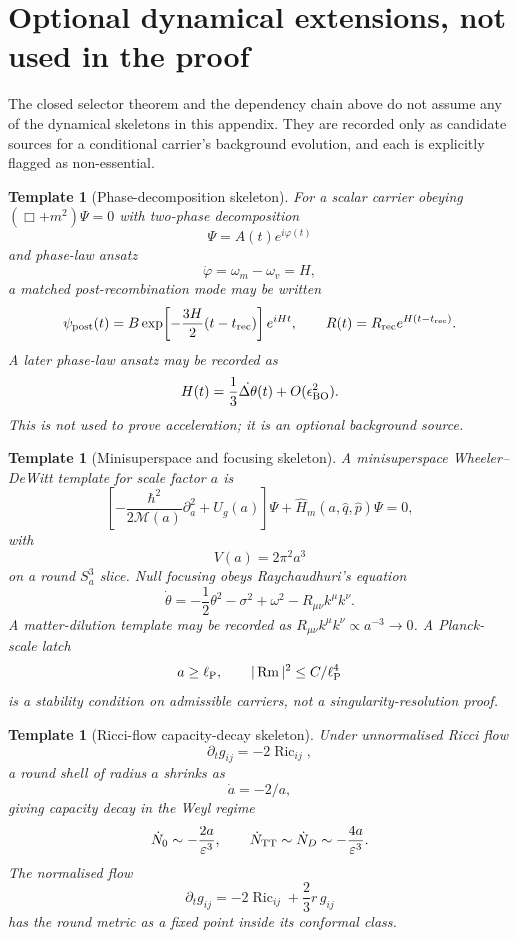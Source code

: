\documentclass[11pt,a4paper]{article}
\newtheorem{template}[theorem]{Template}
\newcommand{\Ric}{\operatorname{Ric}}
\newcommand{\Rm}{\operatorname{Rm}}
\newcommand{\Boxop}{\Box}
\newcommand{\ellP}{\ell_{\rm P}}
\begin{document}
\section{Optional dynamical extensions, not used in the proof}
\label{app:optional-dynamics}

The closed selector theorem and the dependency chain above do not assume any of the dynamical skeletons in this appendix.  They are recorded only as candidate sources for a conditional carrier's background evolution, and each is explicitly flagged as non-essential.

\begin{template}[Phase-decomposition skeleton]
For a scalar carrier obeying $(\Boxop+m^2)\Psi=0$ with two-phase decomposition
\[
\Psi=A(t)e^{i\varphi(t)}
\]
and phase-law ansatz
\[
\dot\varphi=\omega_m-\omega_v=H,
\]
a matched post-recombination mode may be written
\[
\psi_{\rm post}(t)
=
B\exp\!\left[-\frac{3H}{2}(t-t_{\rm rec})\right]e^{iHt},
\qquad
R(t)=R_{\rm rec}e^{H(t-t_{\rm rec})}.
\]
A later phase-law ansatz may be recorded as
\[
H(t)=\frac13\dot{\Delta\theta}(t)+O(\epsilon_{\rm BO}^2).
\]
This is not used to prove acceleration; it is an optional background source.
\end{template}

\begin{template}[Minisuperspace and focusing skeleton]
A minisuperspace Wheeler--DeWitt template for scale factor $a$ is
\[
\left[
-\frac{\hbar^2}{2\mathcal M(a)}\partial_a^2
+
U_g(a)
\right]\Psi
+
\hat H_m(a,\hat q,\hat p)\Psi
=0,
\]
with
\[
V(a)=2\pi^2a^3
\]
on a round $S^3_a$ slice.  Null focusing obeys Raychaudhuri's equation
\[
\dot\theta=-\frac12\theta^2-\sigma^2+\omega^2-R_{\mu\nu}k^\mu k^\nu.
\]
A matter-dilution template may be recorded as $R_{\mu\nu}k^\mu k^\nu\propto a^{-3}\to0$.  A Planck-scale latch
\[
a\ge\ellP,\qquad |\Rm|^2\le C/\ellP^4
\]
is a stability condition on admissible carriers, not a singularity-resolution proof.
\end{template}

\begin{template}[Ricci-flow capacity-decay skeleton]
Under unnormalised Ricci flow
\[
\partial_tg_{ij}=-2\Ric_{ij},
\]
a round shell of radius $a$ shrinks as
\[
\dot a=-2/a,
\]
giving capacity decay in the Weyl regime
\[
\dot N_0\sim-\frac{2a}{\varepsilon^3},
\qquad
\dot N_{\rm TT}\sim\dot N_D\sim-\frac{4a}{\varepsilon^3}.
\]
The normalised flow
\[
\partial_tg_{ij}=-2\Ric_{ij}+\frac23 r\,g_{ij}
\]
has the round metric as a fixed point inside its conformal class.
\end{template}
\end{document}
